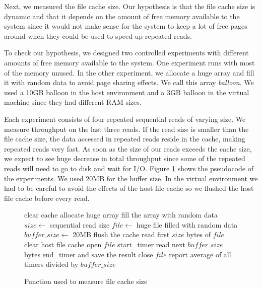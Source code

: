 Next, we measured the file cache size. Our hypothesis is that the file cache size is dynamic and that it depends on the amount of free memory available to the system since it would not make sense for the system to keep a lot of free pages around when they could be used to speed up repeated reads.

To check our hypothesis, we designed two controlled experiments with different amounts of free memory available to the system. One experiment runs with most of the memory unused. In the other experiment, we allocate a huge array and fill it with random data to avoid page sharing effects. We call this array \emph{balloon}. We used a 10GB balloon in the host environment and a 3GB balloon in the virtual machine since they had different RAM sizes.

Each experiment consists of four repeated sequential reads of varying size. We measure throughput on the last three reads. If the read size is smaller than the file cache size, the data accessed in repeated reads reside in the cache, making repeated reads very fast. As soon as the size of our reads exceeds the cache size, we expect to see huge decrease in total throughput since some of the repeated reads will need to go to disk and wait for I/O. Figure \ref{fig:p3pseudo} shows the pseudocode of the experiments. We used 20MB for the buffer size. In the virtual environment we had to be careful to avoid the effects of the host file cache so we flushed the host file cache before every read.

\begin{figure}
\begin{algorithmic}
\STATE clear cache
\STATE allocate huge array
\STATE fill the array with random data
\ENDIF
\STATE $size \leftarrow$ {sequential read size}
\STATE $file \leftarrow$ {huge file filled with random data}
\STATE $buffer\_size \leftarrow$ 20MB
\STATE flush the cache
\STATE read first $size$ bytes of $file$
\STATE clear host file cache
\ENDIF
\STATE open $file$
\STATE start\_timer
\STATE read next $buffer\_size$ bytes
\STATE end\_timer and save the result
\ENDWHILE
\STATE close $file$
\ENDFOR
\STATE report average of all timers divided by $buffer\_size$
\end{algorithmic}
\caption{Function used to measure file cache size}
\label{fig:p3pseudo}
\end{figure}

